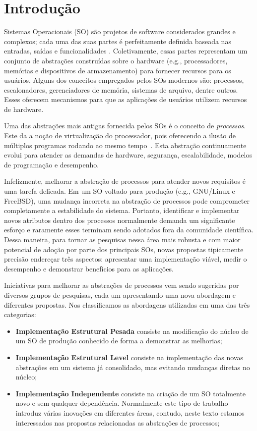 \chapter{Introdução}
\label{cap:introducao}

Sistemas Operacionais (SO) são projetos de software considerados grandes e
complexos; cada uma das suas partes é perfeitamente definida baseada nas
entradas, saídas e funcionalidades \citep{silberschatz}. Coletivamente, essas
partes representam um conjunto de abstrações construídas sobre o hardware
(e.g., processadores, memórias e dispositivos de armazenamento) para fornecer
recursos para os usuários. Alguns dos conceitos empregados pelos SOs modernos
são: processos, escalonadores, gerenciadores de memória, sistemas de arquivo,
dentre outros.  Esses oferecem mecanismos para que as aplicações de usuários
utilizem recursos de hardware.

Uma das abstrações mais antigas fornecida pelos SOs é o conceito de
\textit{processos}. Este da a noção de virtualização do processador, pois
oferecendo a ilusão de múltiplos programas rodando ao mesmo tempo~\citep{love,
tanenbaum}.  Esta abstração continuamente evolui para atender as demandas de
hardware, segurança, escalabilidade, modelos de programação e desempenho.

Infelizmente, melhorar a abstração de processos para atender novos requisitos é
uma tarefa delicada. Em um SO voltado para produção (e.g., GNU/Linux e
FreeBSD), uma mudança incorreta na abstração de processos pode comprometer
completamente a estabilidade do sistema. Portanto, identificar e implementar
novos atributos dentro dos processos normalmente demanda um significante
esforço e raramente esses terminam sendo adotados fora da comunidade
científica. Dessa maneira, para tornar as pesquisas nessa área mais robusta e
com maior potencial de adoção por parte dos principais SOs, novas propostas
tipicamente precisão endereçar três aspectos: apresentar uma implementação
viável, medir o desempenho e demonstrar benefícios para as aplicações.

Iniciativas para melhorar as abstrações de processos vem sendo sugeridas por
diversos grupos de pesquisas, cada um apresentando uma nova abordagem e
diferentes propostas. Nos classificamos as abordagens utilizadas em uma das
três categorias:

\begin{itemize}
\item \textbf{Implementação Estrutural Pesada} consiste na modificação do núcleo
  de um SO de produção conhecido de forma a demonstrar as melhorias;
\item \textbf{Implementação Estrutural Level} consiste na implementação das
  novas abstrações em um sistema já consolidado, mas evitando mudanças diretas
  no núcleo;
\item \textbf{Implementação Independente} consiste na criação de um SO
  totalmente novo e sem qualquer dependência. Normalmente este tipo de trabalho
  introduz várias inovações em diferentes áreas, contudo, neste texto estamos
  interessados nas propostas relacionadas as abstrações de processos;
\end{itemize}

